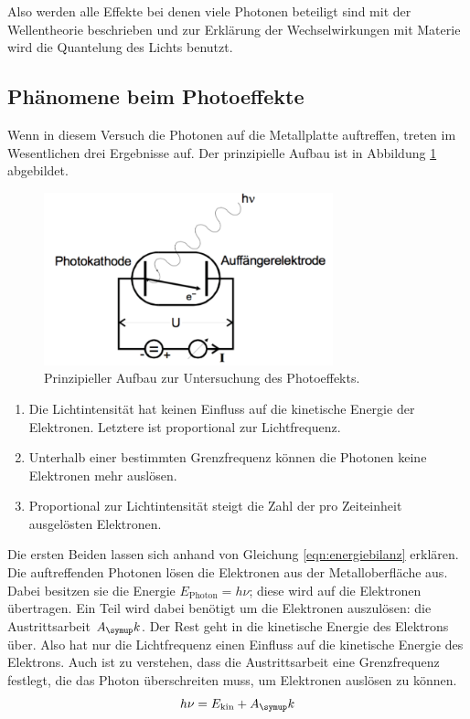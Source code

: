 Also werden alle Effekte bei denen viele Photonen beteiligt sind mit
der Wellentheorie beschrieben und zur Erklärung der Wechselwirkungen mit Materie
wird die Quantelung des Lichts benutzt.

\subsection{Phänomene beim Photoeffekte}

Wenn in diesem Versuch die Photonen auf die Metallplatte auftreffen, treten
im Wesentlichen drei Ergebnisse auf. Der prinzipielle Aufbau ist in Abbildung
\ref{fig:prinzipaufbau} abgebildet.

\begin{figure}[H]
  \centering
  \includegraphics[height = 5cm]{NacktbilderMilaKunis/prinzipaufbau.pdf}
  \caption{Prinzipieller Aufbau zur Untersuchung des Photoeffekts\cite{anleitung}.}
  \label{fig:prinzipaufbau}
\end{figure}

\begin{enumerate}
  \item Die Lichtintensität hat keinen Einfluss auf die kinetische Energie
  der Elektronen. Letztere ist proportional zur Lichtfrequenz.
  \item Unterhalb einer bestimmten Grenzfrequenz können die Photonen
  keine Elektronen mehr auslösen.
  \item Proportional zur Lichtintensität steigt die Zahl der pro Zeiteinheit
  ausgelösten Elektronen.
\end{enumerate}

Die ersten Beiden lassen sich anhand von Gleichung \eqref{eqn:energiebilanz}
erklären. Die auftreffenden Photonen lösen die Elektronen aus der Metalloberfläche aus.
Dabei besitzen sie die Energie $E_\text{Photon} = h \nu$; diese wird
auf die Elektronen übertragen. Ein Teil wird dabei benötigt um die Elektronen
auszulösen: die Austrittsarbeit $A_\g{k}$. Der Rest geht in die kinetische Energie
des Elektrons über.
Also hat nur die Lichtfrequenz einen Einfluss auf die kinetische Energie
des Elektrons.
Auch ist zu verstehen, dass die Austrittsarbeit eine Grenzfrequenz festlegt, die
das Photon überschreiten muss, um Elektronen auslösen zu können.
\begin{equation}
  h \nu = E_\text{kin} + A_\g{k}
  \label{eqn:energiebilanz}
\end{equation}

